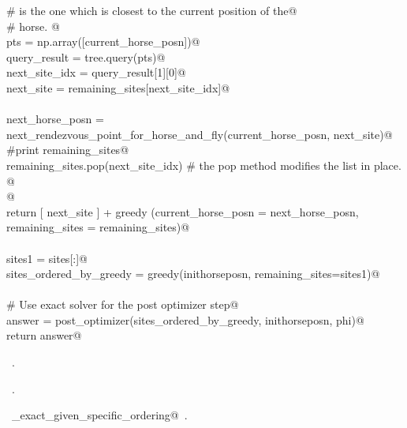 \documentclass[11.5pt]{report}
\begin{document}
\begin{flushleft}
\begin{list}{}{}
\mbox{}\verb@                  # is the one which is closest to the current position of the@\\
\mbox{}\verb@                  # horse. @\\
\mbox{}\verb@                  pts           = np.array([current_horse_posn])@\\
\mbox{}\verb@                  query_result  = tree.query(pts)@\\
\mbox{}\verb@                  next_site_idx = query_result[1][0]@\\
\mbox{}\verb@                  next_site     = remaining_sites[next_site_idx]@\\
\mbox{}\verb@@\\
\mbox{}\verb@                  next_horse_posn = \@\\
\mbox{}\verb@                        next_rendezvous_point_for_horse_and_fly(current_horse_posn, next_site)@\\
\mbox{}\verb@                  #print remaining_sites@\\
\mbox{}\verb@                  remaining_sites.pop(next_site_idx) # the pop method modifies the list in place. @\\
\mbox{}\verb@                  @\\
\mbox{}\verb@                  return [ next_site ] + greedy (current_horse_posn = next_horse_posn, \@\\
\mbox{}\verb@                                                 remaining_sites    = remaining_sites)@\\
\mbox{}\verb@@\\
\mbox{}\verb@      sites1 = sites[:]@\\
\mbox{}\verb@      sites_ordered_by_greedy = greedy(inithorseposn, remaining_sites=sites1)@\\
\mbox{}\verb@@\\
\mbox{}\verb@      # Use exact solver for the post optimizer step@\\
\mbox{}\verb@      answer = post_optimizer(sites_ordered_by_greedy, inithorseposn, phi)@\\
\mbox{}\verb@      return answer@\\
\mbox{}\verb@@{\NWsep}
\end{list}
\vspace{-1.5ex}
\footnotesize
\begin{list}{}{\setlength{\itemsep}{-\parsep}\setlength{\itemindent}{-\leftmargin}}
\item \NWtxtMacroDefBy\ .
\item \NWtxtMacroRefIn\ .
\item \NWtxtIdentsUsed\nobreak\  \verb@algo_exact_given_specific_ordering@\nobreak\ .
\item{}
\end{list}
\vspace{4ex}
\end{flushleft}
\newchunk 
\end{document}
